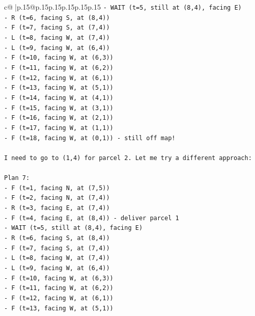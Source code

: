 \documentclass{article}
\begin{document}
{\begin{supertabular}{c@{$\;$}|p{.15\linewidth}@{}p{.15\linewidth}p{.15\linewidth}p{.15\linewidth}p{.15\linewidth}p{.15\linewidth}}
{{{\texttt{{-} WAIT (t=5, still at (8,4), facing E)} \\
\texttt{{-} R (t=6, facing S, at (8,4))} \\
\texttt{{-} F (t=7, facing S, at (7,4))} \\
\texttt{{-} L (t=8, facing W, at (7,4))} \\
\texttt{{-} L (t=9, facing W, at (6,4))} \\
\texttt{{-} F (t=10, facing W, at (6,3))} \\
\texttt{{-} F (t=11, facing W, at (6,2))} \\
\texttt{{-} F (t=12, facing W, at (6,1))} \\
\texttt{{-} F (t=13, facing W, at (5,1))} \\
\texttt{{-} F (t=14, facing W, at (4,1))} \\
\texttt{{-} F (t=15, facing W, at (3,1))} \\
\texttt{{-} F (t=16, facing W, at (2,1))} \\
\texttt{{-} F (t=17, facing W, at (1,1))} \\
\texttt{{-} F (t=18, facing W, at (0,1)) {-} still off map!} \\
\\ 
\texttt{I need to go to (1,4) for parcel 2. Let me try a different approach:} \\
\\ 
\texttt{Plan 7:} \\
\texttt{{-} F (t=1, facing N, at (7,5))} \\
\texttt{{-} F (t=2, facing N, at (7,4))} \\
\texttt{{-} R (t=3, facing E, at (7,4))} \\
\texttt{{-} F (t=4, facing E, at (8,4)) {-} deliver parcel 1} \\
\texttt{{-} WAIT (t=5, still at (8,4), facing E)} \\
\texttt{{-} R (t=6, facing S, at (8,4))} \\
\texttt{{-} F (t=7, facing S, at (7,4))} \\
\texttt{{-} L (t=8, facing W, at (7,4))} \\
\texttt{{-} L (t=9, facing W, at (6,4))} \\
\texttt{{-} F (t=10, facing W, at (6,3))} \\
\texttt{{-} F (t=11, facing W, at (6,2))} \\
\texttt{{-} F (t=12, facing W, at (6,1))} \\
\texttt{{-} F (t=13, facing W, at (5,1))} \\
}}}
\end{supertabular}}
\end{document}
